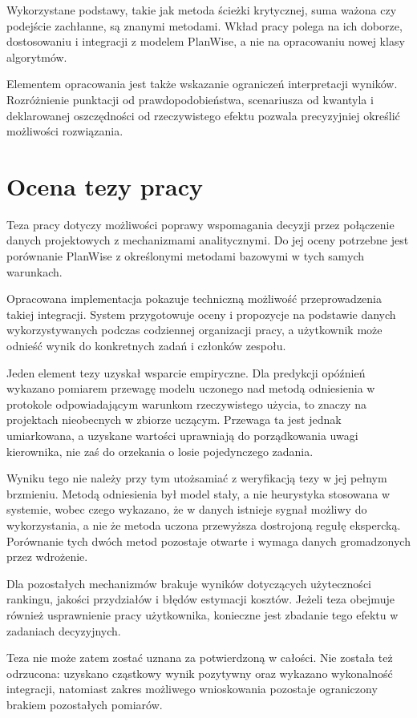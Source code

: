 Wykorzystane podstawy, takie jak metoda ścieżki krytycznej, suma ważona czy podejście zachłanne, są znanymi metodami. Wkład pracy polega na ich doborze, dostosowaniu i integracji z modelem PlanWise, a nie na opracowaniu nowej klasy algorytmów.

Elementem opracowania jest także wskazanie ograniczeń interpretacji wyników. Rozróżnienie punktacji od prawdopodobieństwa, scenariusza od kwantyla i deklarowanej oszczędności od rzeczywistego efektu pozwala precyzyjniej określić możliwości rozwiązania.

\section{Ocena tezy pracy}

Teza pracy dotyczy możliwości poprawy wspomagania decyzji przez połączenie danych projektowych z mechanizmami analitycznymi. Do jej oceny potrzebne jest porównanie PlanWise z określonymi metodami bazowymi w tych samych warunkach.

Opracowana implementacja pokazuje techniczną możliwość przeprowadzenia takiej integracji. System przygotowuje oceny i propozycje na podstawie danych wykorzystywanych podczas codziennej organizacji pracy, a użytkownik może odnieść wynik do konkretnych zadań i członków zespołu.

Jeden element tezy uzyskał wsparcie empiryczne. Dla predykcji opóźnień wykazano pomiarem przewagę modelu uczonego nad metodą odniesienia w protokole odpowiadającym warunkom rzeczywistego użycia, to znaczy na projektach nieobecnych w zbiorze uczącym. Przewaga ta jest jednak umiarkowana, a uzyskane wartości uprawniają do porządkowania uwagi kierownika, nie zaś do orzekania o losie pojedynczego zadania.

Wyniku tego nie należy przy tym utożsamiać z weryfikacją tezy w jej pełnym brzmieniu. Metodą odniesienia był model stały, a nie heurystyka stosowana w systemie, wobec czego wykazano, że w danych istnieje sygnał możliwy do wykorzystania, a nie że metoda uczona przewyższa dostrojoną regułę ekspercką. Porównanie tych dwóch metod pozostaje otwarte i wymaga danych gromadzonych przez wdrożenie.

Dla pozostałych mechanizmów brakuje wyników dotyczących użyteczności rankingu, jakości przydziałów i błędów estymacji kosztów. Jeżeli teza obejmuje również usprawnienie pracy użytkownika, konieczne jest zbadanie tego efektu w zadaniach decyzyjnych.

Teza nie może zatem zostać uznana za potwierdzoną w całości. Nie została też odrzucona: uzyskano cząstkowy wynik pozytywny oraz wykazano wykonalność integracji, natomiast zakres możliwego wnioskowania pozostaje ograniczony brakiem pozostałych pomiarów.

